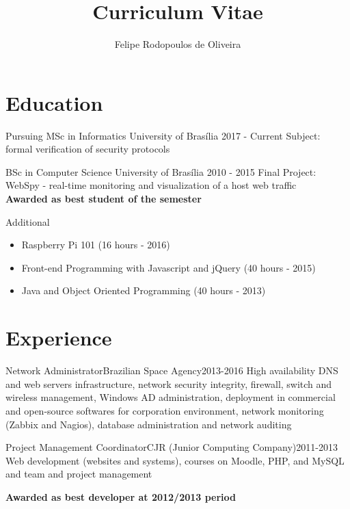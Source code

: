 \documentclass{cv}
\title{Curriculum Vitae}
\author{Felipe Rodopoulos de Oliveira}
\begin{document}
  \maketitle

  \section{Education}
  \begin{chronoitem}
    {Pursuing MSc in Informatics} {University of Brasília} {2017 - Current}
    Subject: formal verification of security protocols
  \end{chronoitem}

  \begin{chronoitem}
    {BSc in Computer Science} {University of Brasília} {2010 - 2015}
    Final Project: WebSpy - real-time monitoring and visualization of a host web traffic \\
    \textbf{Awarded as best student of the semester}
  \end{chronoitem}

  \begin{chronoitem}
    {Additional}{}{}
    \begin{itemize}
      \item[] Raspberry Pi 101 \hfill (16 hours - 2016)
      \item[] Front-end Programming with Javascript and jQuery \hfill (40 hours - 2015)
      \item[] Java and Object Oriented Programming \hfill (40 hours - 2013)
    \end{itemize}
  \end{chronoitem}
  \vspace{-.5cm}

  \section{Experience}
  \begin{chronoitem}
    {Network Administrator}{Brazilian Space Agency}{2013-2016}
    High availability DNS and web servers infrastructure, network security integrity, firewall, switch and wireless management, Windows AD administration, deployment in commercial and open-source softwares for corporation environment, network monitoring (Zabbix and Nagios), database administration and network auditing
  \end{chronoitem}

  \begin{chronoitem}
    {Project Management Coordinator}{CJR (Junior Computing Company)}{2011-2013}
    Web development (websites and systems), courses on Moodle, PHP, and MySQL and team and project management \par
    \textbf{Awarded as best developer at 2012/2013 period}
  \end{chronoitem}
  \vspace{-.5cm}
\end{document}
